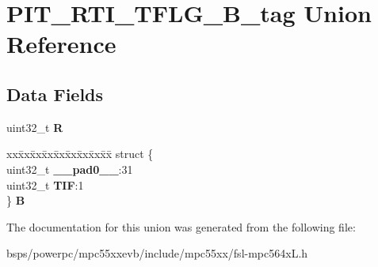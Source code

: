 \hypertarget{unionPIT__RTI__TFLG__32B__tag}{}\section{P\+I\+T\+\_\+\+R\+T\+I\+\_\+\+T\+F\+L\+G\+\_\+B\+\_\+tag Union Reference}
\label{unionPIT__RTI__TFLG__32B__tag}
\subsection*{Data Fields}
\begin{DoxyCompactItemize}
\item 
\mbox{\label{unionPIT__RTI__TFLG__32B__tag_a9972e10b228b1ee38ef65a2765e6d38d}} 
uint32\+\_\+t {\bfseries R}
\item 
\mbox{\label{unionPIT__RTI__TFLG__32B__tag_a32e4f45f410121a214acfaf25d73870f}} 
\begin{tabbing}
xx\=xx\=xx\=xx\=xx\=xx\=xx\=xx\=xx\=\kill
struct \{\\
\>uint32\_t {\bfseries \_\_pad0\_\_}:31\\
\>uint32\_t {\bfseries TIF}:1\\
\} {\bfseries B}\\

\end{tabbing}\end{DoxyCompactItemize}


The documentation for this union was generated from the following file\+:\begin{DoxyCompactItemize}
\item 
bsps/powerpc/mpc55xxevb/include/mpc55xx/fsl-\/mpc564x\+L.\+h\end{DoxyCompactItemize}
